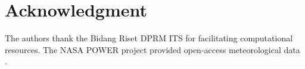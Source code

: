 \documentclass[journal]{IEEEtran}
\begin{document}
\section*{Acknowledgment}
The authors thank the Bidang Riset DPRM ITS for facilitating
computational resources. The NASA POWER project provided open-access
meteorological data \cite{nasapower2024}.



\end{document}
